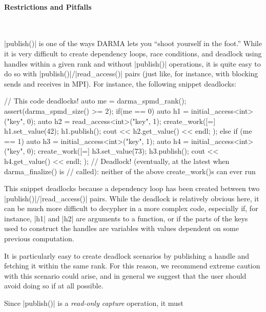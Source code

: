 \paragraph{Restrictions and Pitfalls}\mbox{}\\
\begin{compactitem}
  \item |publish()| is one of the ways DARMA lets you ``shoot yourself in
  the foot.''  While it is very difficult to create dependency loops, race
  conditions, and deadlock using handles within a given rank and without
  |publish()| operations, it is quite easy to do so with
  |publish()|/|read_access()| pairs (just like, for instance,
  with blocking sends and receives in MPI).  For instance, the following snippet
  deadlocks:
  \begin{CppCode}
// This code deadlocks!
auto me = darma_spmd_rank();
assert(darma_spmd_size() >= 2);
if(me == 0) {
  auto h1 = initial_access<int>("key", 0);
  auto h2 = read_access<int>("key", 1);
  create_work([=]{ 
    h1.set_value(42);
    h1.publish();
    cout << h2.get_value() << endl;
  }); 
}
else if (me == 1) {
  auto h3 = initial_access<int>("key", 1);
  auto h4 = initial_access<int>("key", 0);
  create_work([=]{ 
    h3.set_value(73);
    h3.publish();
    cout << h4.get_value() << endl; 
  }); 
}
// Deadlock! (eventually, at the latest when darma_finalize() is
// called): neither of the above create_work()s can ever run
  \end{CppCode}
  This snippet deadlocks because a dependency loop has been created between two
  |publish()|/|read_access()| pairs. While the deadlock is
  relatively obvious here, it can be much more difficult to decypher in a more
  complex code, especially if, for instance, |h1| and |h2| are
  arguments to a function, or if the parts of the keys used to construct the
  handles are variables with values dependent on some previous computation.
  \item It is particularly easy to create deadlock scenarios by publishing a
  handle and fetching it within the same rank.  For this reason, we recommend
  extreme caution with this scenario could arise, and in general we suggest that
  the user should avoid doing so if at all possible.
  \item Since |publish()| is a {\it read-only capture} operation, it must

\end{compactitem}
